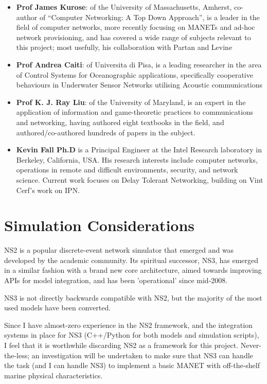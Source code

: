 \documentclass[twoside,10pt,a4paper]{Latex/Classes/PhDthesisPSnPDF}
\begin{document}
\begin{itemize}
  \item \textbf{Prof James Kurose}: of the University of Massachusetts, 
    Amherst, co-author of  ``Computer Networking: A Top Down Approach'', is a 
    leader in the field of computer networks, more recently focusing on MANETs 
    and ad-hoc network provisioning, and has covered a wide range of
    subjects relevant to this project; most usefully, his collaboration with 
    Partan and Levine \cite{Partan2006}
  \item \textbf{Prof Andrea Caiti}: of Universita di Pisa, is a leading 
    researcher in the area of Control Systems for Oceanographic applications, 
    specifically cooperative behaviours in Underwater Sensor Networks utilising 
    Acoustic communications \cite{Caiti} \cite{Caitia} \cite{Caiti2011}
  \item \textbf{Prof K. J. Ray Liu}: of the University of Maryland, is an 
    expert in the application of information and game-theoretic practices to 
    communications and networking, having authored eight textbooks in the 
    field, and authored/co-authored hundreds of papers in the subject.  
    \cite{Liu2006} \cite{Sun2008}
  \item \textbf{Kevin Fall Ph.D} is a Principal Engineer at the Intel Research 
    laboratory in Berkeley, California, USA.  His research interests include 
    computer networks, operations in remote and difficult environments, 
    security, and network science. Current work focuses on Delay Tolerant 
    Networking, building on Vint Cerf's work on IPN. \cite{Fall2003}
\end{itemize}

\section{Simulation Considerations}
NS2 is a popular discrete-event network simulator that emerged and was developed
by the academic community. Its spiritual successor, NS3, has emerged in a
similar fashion with a brand new core architecture, aimed towards improving APIs for model
integration, and has been 'operational' since mid-2008.

NS3 is not directly backwards compatible with NS2, but the majority of the most 
used models have been converted.

Since I have almost-zero experience in the NS2 framework, and the integration
systems in place for NS3 (C++/Python for both models and simulation scripts), I
feel that it is worthwhile discarding NS2 as a framework for this project.
Never-the-less; an investigation will be undertaken to make sure that NS3 can
handle the task (and I can handle NS3) to implement a basic MANET with
off-the-shelf marine physical characteristics.
\end{document}
